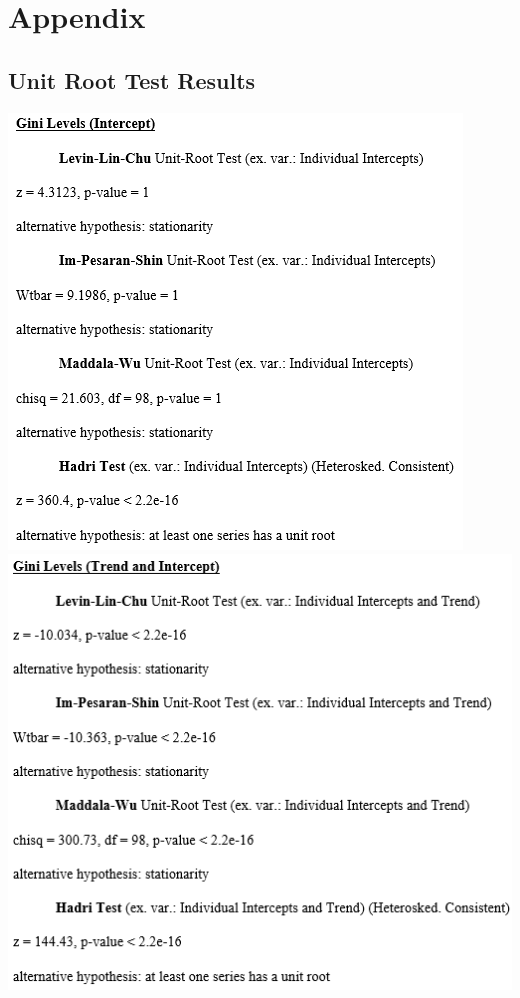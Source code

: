 \documentclass[11pt,preprint, authoryear]{elsarticle}
\numberwithin{equation}{section}
\numberwithin{figure}{section}
\numberwithin{table}{section}
\begin{document}
\newpage

\hypertarget{appendix}{%
\section*{Appendix}\label{appendix}}

\hypertarget{unit-root-test-results}{%
\subsection{\texorpdfstring{Unit Root Test Results
\label{A}}{Unit Root Test Results }}\label{unit-root-test-results}}

\begin{center}\includegraphics[width=0.49\linewidth,height=0.35\textheight]{images/Gini_Levels_Intercept} \includegraphics[width=0.49\linewidth,height=0.35\textheight]{images/Gini_Levels_Trend} \end{center}
\end{document}
